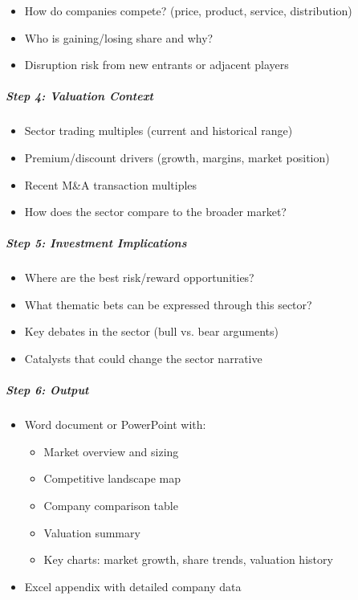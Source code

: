 \documentclass[11pt]{article}
\begin{document}
\begin{itemize}[leftmargin=*,itemsep=2pt,topsep=2pt]
\item {} How do companies compete? (price, product, service, distribution)
\item {} Who is gaining/losing share and why?
\item {} Disruption risk from new entrants or adjacent players
\end{itemize}

\subparagraph{Step 4: Valuation Context}\mbox{}\par

\begin{itemize}[leftmargin=*,itemsep=2pt,topsep=2pt]
\item {} Sector trading multiples (current and historical range)
\item {} Premium/discount drivers (growth, margins, market position)
\item {} Recent M\&A transaction multiples
\item {} How does the sector compare to the broader market?
\end{itemize}

\subparagraph{Step 5: Investment Implications}\mbox{}\par

\begin{itemize}[leftmargin=*,itemsep=2pt,topsep=2pt]
\item {} Where are the best risk/reward opportunities?
\item {} What thematic bets can be expressed through this sector?
\item {} Key debates in the sector (bull vs. bear arguments)
\item {} Catalysts that could change the sector narrative
\end{itemize}

\subparagraph{Step 6: Output}\mbox{}\par

\begin{itemize}[leftmargin=*,itemsep=2pt,topsep=2pt]
\item {} Word document or PowerPoint with:
\begin{itemize}[leftmargin=*,itemsep=2pt,topsep=2pt]
\item {} Market overview and sizing
\item {} Competitive landscape map
\item {} Company comparison table
\item {} Valuation summary
\item {} Key charts: market growth, share trends, valuation history
\end{itemize}
\item {} Excel appendix with detailed company data
\end{itemize}
\end{document}
